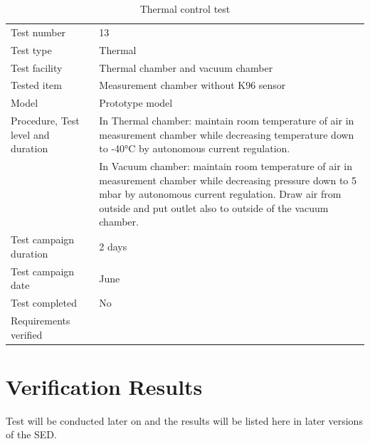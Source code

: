 \documentclass[12pt,a4paper]{report}
\begin{document}
\begin{table}[H]
\centering
\caption{Thermal control test}
\label{tab:test_thermal}
\begin{tabular}{L{5cm}L{10cm}}
\toprule
Test number & 13 \\
Test type & Thermal \\
Test facility & Thermal chamber and vacuum chamber \\
Tested item & Measurement chamber without K96 sensor \\
Model & Prototype model \\
Procedure, Test level and duration & In Thermal chamber: maintain room temperature of air in measurement chamber while decreasing temperature down to -40°C by autonomous current regulation. \\
& In Vacuum chamber: maintain room temperature of air in measurement chamber while decreasing pressure down to 5\,mbar by autonomous current regulation. Draw air from outside and put outlet also to outside of the vacuum chamber. \\
Test campaign duration & 2 days \\
Test campaign date & June \\
Test completed & No \\
Requirements verified & \\
\bottomrule
\end{tabular}
\end{table}



\section{Verification Results}
Test will be conducted later on and the results will be listed here in later versions of the SED.
%
%
\end{document}
